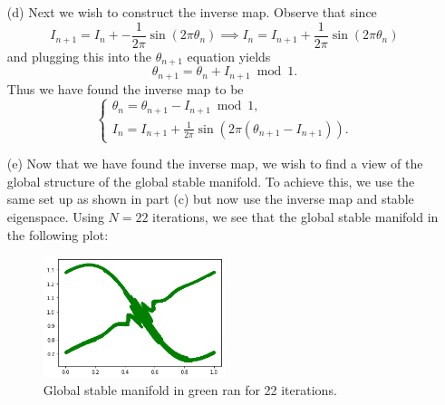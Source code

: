 \documentclass[12pt]{report}
\begin{document}
\begin{solution}
\begin{enumerate}
        \item [(d)]
        Next we wish to construct the inverse map. Observe that since
        \[ 
            I_{n+1} = I_n + - \frac{1}{2\pi} \sin(2\pi \theta_n) \implies I_n = I_{n+1} + \frac{1}{2\pi}\sin(2\pi \theta_n)
        \]
        and plugging this into the $\theta_{n+1}$ equation yields
        \[ 
            \theta_{n+1} = \theta_{n} + I_{n+1} \bmod 1.
        \]
        Thus we have found the inverse map to be
        \[ 
            \begin{cases}
                \theta_n = \theta_{n+1} - I_{n+1} \bmod 1,\\
                I_n = I_{n+1} + \frac{1}{2\pi}\sin(2\pi (\theta_{n+1} - I_{n+1})).
            \end{cases}
        \]




        \item [(e)]
        Now that we have found the inverse map, we wish to find a view of the global structure of the global stable manifold. To achieve this, we use the same set up as shown in part (c) but now use the inverse map and stable eigenspace. Using $N=22$ iterations, we see that the global stable manifold in the following plot:  
        \begin{figure}[H]
            \centering
            \hspace*{0cm}\includegraphics[width=0.5\textwidth,height=\textwidth,keepaspectratio]{images/7-e.png}
            \caption{Global stable manifold in green ran for 22 iterations.}
        \end{figure}
        

\end{enumerate}
\end{solution}
\end{document}

